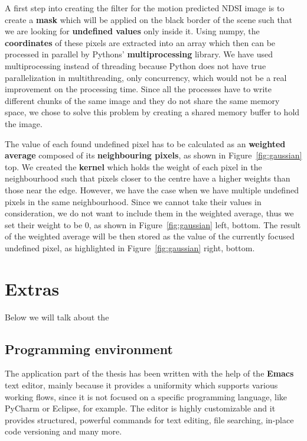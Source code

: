 \documentclass[12pt, a4paper]{report}
\begin{document}
	\par A first step into creating the filter for the motion predicted NDSI image is to create a \textbf{mask} which will be applied on the black border of the scene such that we are looking for \textbf{undefined values} only inside it. Using numpy, the \textbf{coordinates} of these pixels are extracted into an array which then can be processed in parallel by Pythons' \textbf{multiprocessing} library. We have used multiprocessing instead of threading because Python does not have true parallelization in multithreading, only concurrency, which would not be a real improvement on the processing time. Since all the processes have to write different chunks of the same image and they do not share the same memory space, we chose to solve this problem by creating a shared memory buffer to hold the image.

	\par The value of each found undefined pixel has to be calculated as an \textbf{weighted average} composed of its \textbf{neighbouring pixels}, as shown in Figure~\ref{fig:gaussian} top. We created the \textbf{kernel} which holds the weight of each pixel in the neighbourhood such that pixels closer to the centre have a higher weights than those near the edge. However, we have the case when we have multiple undefined pixels in the same neighbourhood. Since we cannot take their values in consideration, we do not want to include them in the weighted average, thus we set their weight to be 0, as shown in Figure~\ref{fig:gaussian} left, bottom. The result of the weighted average will be then stored as the value of the currently focused undefined pixel, as highlighted in Figure~\ref{fig:gaussian} right, bottom.

		
	\section{Extras}
	\label{seq:extras}
	Below we will talk about the 

	
	\subsection{Programming environment}
	\label{seq:programmingenv}
	
	\par The application part of the thesis has been written with the help of the \textbf{Emacs} text editor, mainly because it provides a uniformity which supports various working flows, since it is not focused on a specific programming language, like PyCharm or Eclipse, for example. The editor is highly customizable and it provides structured, powerful commands for text editing, file searching, in-place code versioning and many more.
	
\end{document}
